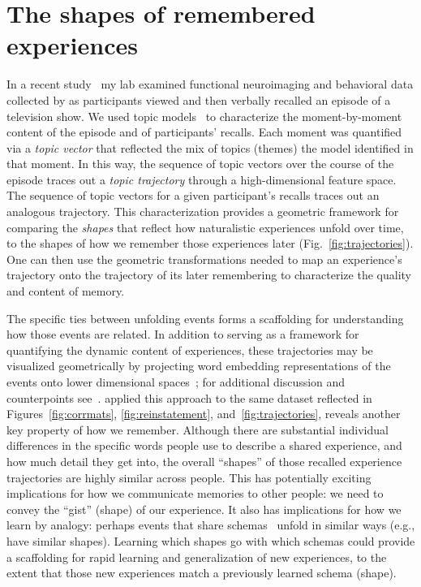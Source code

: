 \documentclass{article}
\begin{document}
\section*{The shapes of remembered experiences}
In a recent study~\citep{HeusEtal18c} my lab examined functional neuroimaging and behavioral data collected by \cite{ChenEtal17} as participants viewed and then verbally recalled an episode of a television show.  We used topic models~\citep{BleiEtal03} to characterize the moment-by-moment content of the episode and of participants' recalls.  Each moment was quantified via a \textit{topic vector} that reflected the mix of topics (themes) the model identified in that moment.  In this way, the sequence of topic vectors over the course of the episode traces out a \textit{topic trajectory} through a high-dimensional feature space.  The sequence of topic vectors for a given participant's recalls traces out an analogous trajectory.  This characterization provides a geometric framework for comparing the \textit{shapes} that reflect how naturalistic experiences unfold over time, to the shapes of how we remember those experiences later (Fig.~\ref{fig:trajectories}).  One can then use the geometric transformations needed to map an experience's trajectory onto the trajectory of its later remembering to characterize the quality and content of memory.

The specific ties between unfolding events forms a scaffolding for understanding how those events are related.  In addition to serving as a framework for quantifying the dynamic content of experiences, these trajectories may be visualized geometrically by projecting word embedding representations of the events onto lower dimensional spaces~\citep[e.g., ][]{HeusEtal18a}; for additional discussion and counterpoints see~\citep{JollChan18}.  \cite{HeusEtal18c} applied this approach to the same dataset reflected in Figures~\ref{fig:corrmats}, \ref{fig:reinstatement}, and~\ref{fig:trajectories}, reveals another key property of how we remember.  Although there are substantial individual differences in the specific words people use to describe a shared experience, and how much detail they get into, the overall ``shapes'' of those recalled experience trajectories are highly similar across people.  This has potentially exciting implications for how we communicate memories to other people: we need to convey the ``gist'' (shape) of our experience.  It also has implications for how we learn by analogy: perhaps events that share schemas~\citep[e.g., ][]{BaldEtal18}  unfold in similar ways (e.g., have similar shapes).  Learning which shapes go with which schemas could provide a scaffolding for rapid learning and generalization of new experiences, to the extent that those new experiences match a previously learned schema (shape).
\end{document}
